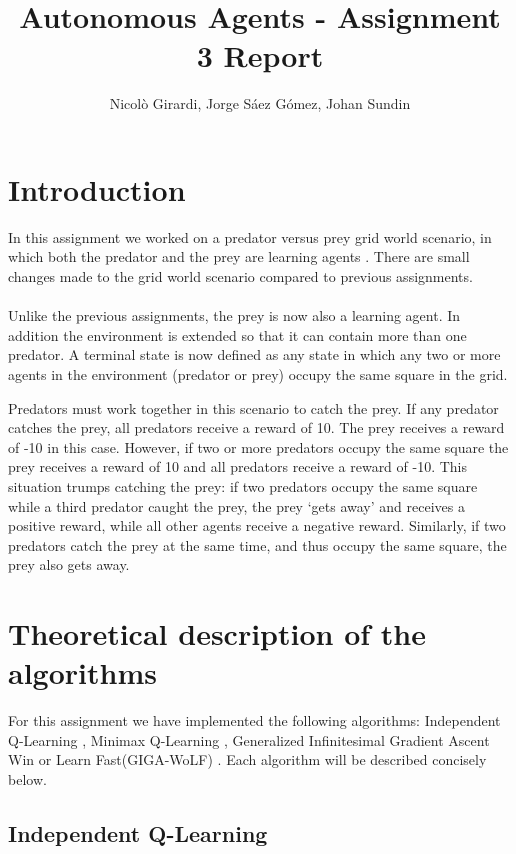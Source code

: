 \documentclass[a4paper,12pt]{article}
\title{Autonomous Agents - Assignment 3 Report}
\author{Nicolò Girardi, Jorge Sáez Gómez, Johan Sundin}
\begin{document}
\maketitle

\section{Introduction}

In this assignment we worked on a predator versus prey grid world scenario, in which both the predator and the prey are learning agents  \cite{Assignment}. There are small changes made to the grid world scenario compared to previous assignments.%
\\
\\
Unlike the previous assignments, the prey is now also a learning agent. In addition the environment is extended so that it can contain more than one predator. A terminal state is now defined as any state in which any two or more agents in the environment (predator or prey) occupy the same square in the grid.

Predators must work together in this scenario to catch the prey. If any predator catches the
prey, all predators receive a reward of 10. The prey receives a reward of -10 in this case.
However, if two or more predators occupy the same square the prey receives a reward of
10 and all predators receive a reward of -10. This situation trumps catching the prey: if two
predators occupy the same square while a third predator caught the prey, the prey ‘gets away’
and receives a positive reward, while all other agents receive a negative reward. Similarly, if two
predators catch the prey at the same time, and thus occupy the same square, the prey also gets
away.

\section{Theoretical description of the algorithms}

For this assignment we have implemented the following algorithms: Independent Q-Learning \cite{vlasis}, Minimax Q-Learning \cite{minimax}, Generalized Infinitesimal Gradient Ascent Win or Learn Fast(GIGA-WoLF) \cite{GIGA-wolf}. Each algorithm will be described concisely below.

\subsection{Independent Q-Learning}
\end{document}
